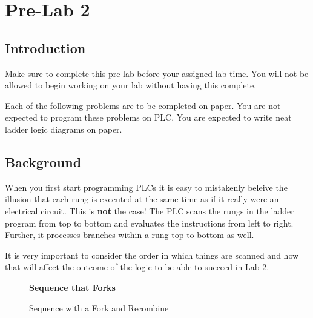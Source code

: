 \chapter{Pre-Lab 2}
\setcounter{TASignatures}{0}
\setcounter{AsideCounter}{0}

\section{Introduction}

Make sure to complete this pre-lab before your assigned lab time. You will not be allowed to begin working on your lab without having this complete.

Each of the following problems are to be completed on paper. You are not expected to program these problems on PLC. You are expected to write neat ladder logic diagrams on paper.

\section{Background}


When you first start programming PLCs it is easy to mistakenly beleive the illusion that each rung is executed at the same time as if it really were an electrical circuit. This is \textbf{not} the case! The PLC scans the rungs in the ladder program from top to bottom and evaluates the instructions from left to right. Further, it processes branches within a rung top to bottom as well.

It is very important to consider the order in which things are scanned and how that will affect the outcome of the logic to be able to succeed in Lab 2.



\begin{figure}[!b]
\centering
\textbf{Sequence that Forks}\par \medskip
{}
\caption{Sequence with a Fork and Recombine}
\label{fig:ForkingSequence}
\end{figure}

